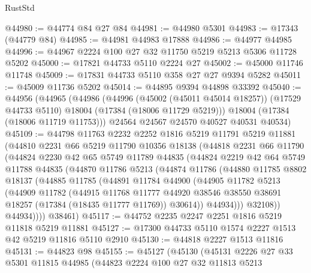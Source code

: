 \begin{lexlean}{RustStd}
\begin{coremodule}
@44980 := @44774 @84 @27 @84
@44981 := @44980 @5301
@44983 := @17343 (@44779 @84)
@44985 := @44981 @44983 @17888
@44986 := @44977 @44985
@44996 := @44967 @2224 @100 @27 @32 @11750 @5219 @5213 @5306 @11728 @5202
@45000 := @17821 @44733 @5110 @2224 @27
@45002 := @45000 @11746 @11748
@45009 := @17831 @44733 @5110 @358 @27 @27 @9394 @5282
@45011 := @45009 @11736 @5202
@45014 := @44895 @9394 @44898 @33392
@45040 := @44956
    (@44965
      (@44986
        (@44996
          (@45002 (@45011 @45014 @18257))
          (@17529 @44733 @5110)
          @18004
          (@17384 (@18006 @11729 @5219)))
        @18004
        (@17384 (@18006 @11719 @11753)))
      @24564
      @24567
      @24570
      @40527
      @40531
      @40534)
@45109 := @44798
    @11763
    @2232
    @2252
    @1816
    @5219
    @11791
    @5219
    @11881
    (@44810
      @2231
      @66
      @5219
      @11790
      @10356
      @18138
      (@44818
        @2231
        @66
        @11790
        (@44824
          @2230
          @42
          @65
          @5749
          @11789
          @44835
          (@44824
            @2219
            @42
            @64
            @5749
            @11788
            @44835
            (@44870
              @11786
              @5213
              (@44874
                @11786
                (@44880
                  @11785
                  @8802
                  @18137
                  (@44885
                    @11785
                    (@44891
                      @11784
                      @44900
                      (@44905
                        @11782
                        @5213
                        (@44909
                          @11782
                          (@44915
                            @11768
                            @11777
                            @44920
                            @38546
                            @38550
                            @38691
                            @18257
                            (@17384 (@18435 @11777 @11769))
                            @30614))
                        @44934)))
                  @32108))
              @44934))))
      @38461)
@45117 := @44752 @2235 @2247 @2251 @1816 @5219 @11818 @5219 @11881
@45127 := @17300 @44733 @5110 @1574 @2227 @1513 @42 @5219 @11816 @5110 @2910
@45130 := @44818 @2227 @1513 @11816
@45131 := @44823 @98
@45155 := @45127
    (@45130
      (@45131
        @2226
        @27
        @33
        @5301
        @11815
        @44985
        (@44823
          @2224
          @100
          @27
          @32
          @11813
          @5213

\end{coremodule}
\end{lexlean}

